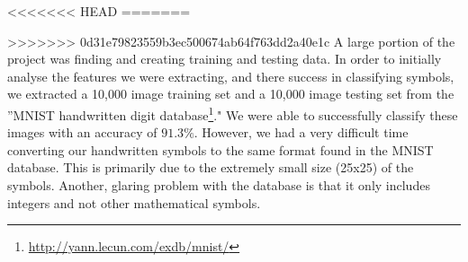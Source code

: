 <<<<<<< HEAD
=======

>>>>>>> 0d31e79823559b3ec500674ab64f763dd2a40e1c
A large portion of the project was finding and creating training and testing data. In order to initially analyse the features we were extracting, and there success in classifying symbols, we extracted a 10,000 image training set and a 10,000 image testing set from the  ''MNIST handwritten digit database\footnote{\url{http://yann.lecun.com/exdb/mnist/}}." We were able to successfully classify these images with an accuracy of $91.3\%$. However, we had a very difficult time converting our handwritten symbols to the same format found in the MNIST database. This is primarily due to the extremely small size (25x25) of the symbols. Another, glaring problem with the database is that it only includes integers and not other mathematical symbols.


